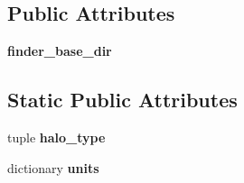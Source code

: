 \subsection*{Public Attributes}
\begin{DoxyCompactItemize}
\item 
\hypertarget{classseren3_1_1halos_1_1halos_1_1ConsistentTreesCatalogue_afe0d77ed516a510f1443f8fca30d45b0}{
{\bfseries finder\_\-base\_\-dir}}
\label{classseren3_1_1halos_1_1halos_1_1ConsistentTreesCatalogue_afe0d77ed516a510f1443f8fca30d45b0}

\end{DoxyCompactItemize}
\subsection*{Static Public Attributes}
\begin{DoxyCompactItemize}
\item 
\hypertarget{classseren3_1_1halos_1_1halos_1_1ConsistentTreesCatalogue_a55279c019f1b4133818810a84e65ca08}{
tuple {\bfseries halo\_\-type}}
\label{classseren3_1_1halos_1_1halos_1_1ConsistentTreesCatalogue_a55279c019f1b4133818810a84e65ca08}

\item 
dictionary {\bfseries units}
\end{DoxyCompactItemize}


